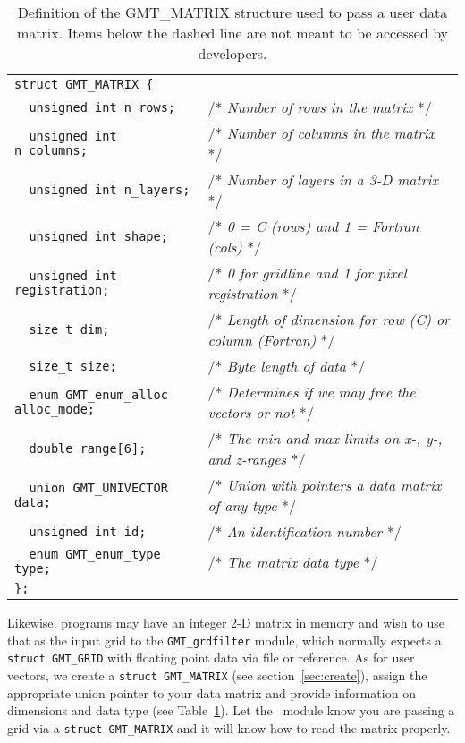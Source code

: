 \documentclass[11pt]{report}
\begin{document}
\begin{table}[h]
\small
\centering
\begin{tabular}{ll} \hline
\verb!struct GMT_MATRIX {!               & \\
\verb!  unsigned int n_rows;!            & /* \emph{Number of rows in the matrix} */ \\
\verb!  unsigned int n_columns;!         & /* \emph{Number of columns in the matrix} */\\
\verb!  unsigned int n_layers;!          & /* \emph{Number of layers in a 3-D matrix} */\\
\verb!  unsigned int shape;!             & /* \emph{0 = C (rows) and 1 = Fortran (cols)} */\\
\verb!  unsigned int registration;!      & /* \emph{0 for gridline and 1 for pixel registration} */\\
\verb!  size_t dim;!                     & /* \emph{Length of dimension for row (C) or column (Fortran)} */\\
\verb!  size_t size;!                    & /* \emph{Byte length of data} */\\
\verb!  enum GMT_enum_alloc alloc_mode;! & /* \emph{Determines if we may free the vectors or not} */\\
\verb!  double range[6];!                & /* \emph{The min and max limits on x-, y-, and z-ranges} */\\
\verb!  union GMT_UNIVECTOR data;!       & /* \emph{Union with pointers a data matrix of any type} */\\ \hdashline
\verb!  unsigned int id;!                & /* \emph{An identification number} */ \\
\verb!  enum GMT_enum_type type;!        & /* \emph{The matrix data type} */\\
\verb!};!                              & \\ \hline
\end{tabular}
\caption{Definition of the GMT\_MATRIX structure used to pass a user data matrix. Items below the dashed
line are not meant to be accessed by developers.}
\label{tbl:matrix}
\end{table}
\noindent
Likewise, programs may have an integer 2-D matrix in memory 
and wish to use that as the input grid to the \texttt{GMT\_grdfilter} module, which normally
expects a \texttt{struct GMT\_GRID} with floating point data via file or reference.  As for user vectors, we create a
\texttt{struct GMT\_MATRIX} (see section~\ref{sec:create}), assign the appropriate union pointer to your data
matrix and provide information on dimensions and data type (see Table~\ref{tbl:matrix}).
Let the \GMT\ module know you are passing a grid via a
\texttt{struct GMT\_MATRIX} and it will know how to read the matrix properly.
\end{document}
